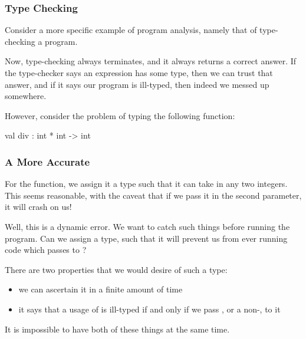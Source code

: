 \documentclass[aspectratio=169, handout]{beamer}
\begin{document}

\begin{frame}[fragile]
  \frametitle{Type Checking}

  Consider a more specific example of program analysis, namely that of
  type-checking a program.

  \pause
  \vspace{\fill}

  Now, type-checking always terminates, and it always returns a correct
  answer. If the type-checker says an expression has some type, then we
  can trust that answer, and if it says our program is ill-typed, then
  indeed we messed up somewhere.

  \pause
  \vspace{\fill}

  However, consider the problem of typing the following function:
  \begin{codeblock}
    val div : int * int -> int
  \end{codeblock}
\end{frame}

\begin{frame}[fragile]
  \frametitle{A More Accurate }

  For the  function, we assign it a type such that it can
  take in any two integers. This seems reasonable, with the caveat that
  if we pass it  in the second parameter, it will crash on us!

  \pause
  \vspace{\fill}

  Well, this is a dynamic error. We want to catch such things before running
  the program. Can we assign  a type, such that it will prevent us
  from ever running code which passes  to ?

  \pause
  \vspace{\fill}

  There are two properties that we would desire of such a type:
  \begin{itemize}
    \item we can ascertain it in a finite amount of time \pause
    \item it says that a usage of  is ill-typed if and only if
    we pass , or a non-, to it
  \end{itemize}

  \pause
  \vspace{\fill}

  It is impossible to have both of these things at the same time.
\end{frame}
\end{document}
